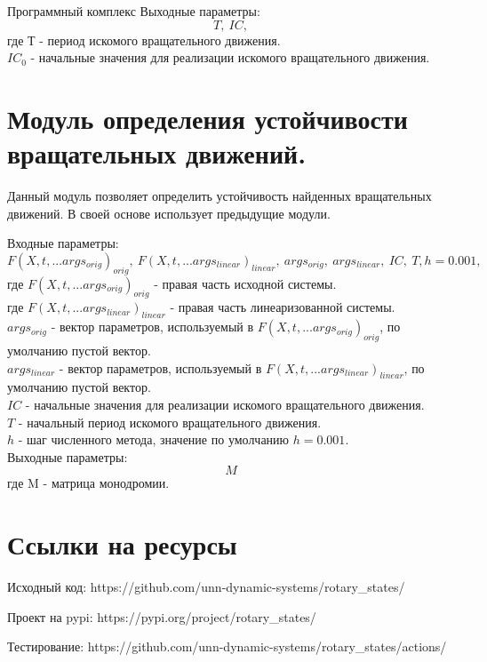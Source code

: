 \begin{chapter}{Программный комплекс}
Выходные параметры: $$T,  \ IC,$$
где $\text{Т}$ - период искомого вращательного движения. \\
$IC_0$ - начальные значения для реализации искомого вращательного движения. \\


\section{Модуль определения устойчивости вращательных движений.}
Данный модуль позволяет определить устойчивость найденных вращательных движений.
В своей основе использует предыдущие модули.

Входные параметры: $$F(X, t, ...args_{orig})_{orig}, \ F(X, t, ...args_{linear})_{linear}, \ args_{orig}, \ args_{linear}, \ IC, \ T , h=0.001,$$
где $F(X, t, ...args_{orig})_{orig}$ - правая часть исходной системы. \\
где $F(X, t, ...args_{linear})_{linear}$ - правая часть линеаризованной  системы. \\
$args_{orig}$ - вектор параметров, используемый в $F(X, t, ...args_{orig})_{orig}$, по умолчанию пустой вектор. \\ 
$args_{linear}$ - вектор параметров, используемый в $F(X, t, ...args_{linear})_{linear}$, по умолчанию пустой вектор. \\
$IC$ - начальные значения для реализации искомого вращательного движения.\\
$T$ - начальный период искомого вращательного движения.\\
$h$ - шаг численного метода, значение по умолчанию $h = 0.001$. \\

Выходные параметры: $$M$$
где $\text{M}$ - матрица монодромии.

\section{Ссылки на ресурсы}
Исходный код: https://github.com/unn-dynamic-systems/rotary\_states/

Проект на pypi: https://pypi.org/project/rotary\_states/

Тестирование: https://github.com/unn-dynamic-systems/rotary\_states/actions/

\end{chapter}